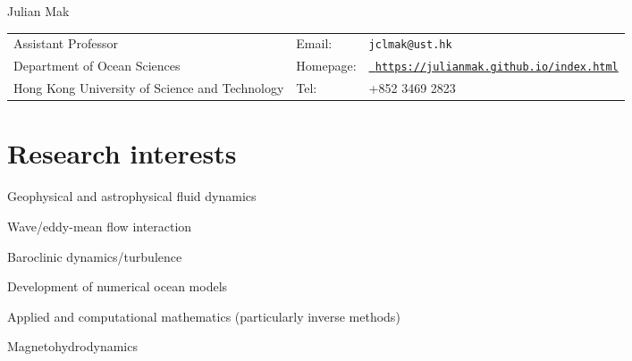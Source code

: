 \documentclass[letterpaper]{article}
\def\name{Julian Mak}
\renewenvironment{itemize}{
  \begin{list}{}{
    \setlength{\leftmargin}{1.5em}
  }
}{
  \end{list}
}
\begin{document}
{\huge \name}


\vspace{0.25in}
\begin{tabular}{lll}
  Assistant Professor & Email: & {\tt jclmak@ust.hk} \\
  Department of Ocean Sciences & Homepage: & \href{https://julianmak.github.io/index.html}{\tt
https://julianmak.github.io/index.html} \\
  Hong Kong University of Science and Technology & Tel: & +852 3469 2823
\end{tabular}
\section*{Research interests}
\begin{itemize}
\item Geophysical and astrophysical fluid dynamics
\begin{itemize}
	\item[--] Wave/eddy-mean flow interaction
	\item[--] Baroclinic dynamics/turbulence
	\item[--] Development of numerical ocean models
	\item[--] Applied and computational mathematics (particularly inverse methods)
	\item[--] Magnetohydrodynamics
\end{itemize}
\end{itemize}
\end{document}
